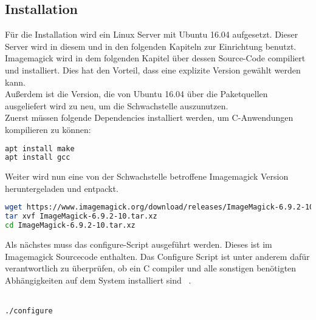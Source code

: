 \subsection{Installation}\label{subsec:installation}

Für die Installation wird ein Linux Server mit Ubuntu 16.04 aufgesetzt.
Dieser Server wird in diesem und in den folgenden Kapiteln zur Einrichtung benutzt.\\

Imagemagick wird in dem folgenden Kapitel über dessen Source-Code compiliert und installiert.
Dies hat den Vorteil, dass eine explizite Version gewählt werden kann.\\

Außerdem ist die Version, die von Ubuntu 16.04 über die Paketquellen ausgeliefert wird zu neu,
um die Schwachstelle auszunutzen.\\

Zuerst müssen folgende Dependencies installiert werden, um C-Anwendungen kompilieren zu können:

\begin{lstlisting}[language=Bash, caption=Imagemagick Installation: Dependencies,label={lst:installdep}]
apt install make
apt install gcc
\end{lstlisting}
\vspace{5mm}

Weiter wird nun eine von der Schwachstelle betroffene Imagemagick Version heruntergeladen und entpackt.
\begin{lstlisting}[language=Bash, caption=Imagemgaick Installation: Source Code herunterladen und entpacken,label={lst:installsource}]
wget https://www.imagemagick.org/download/releases/ImageMagick-6.9.2-10.tar.xz
tar xvf ImageMagick-6.9.2-10.tar.xz
cd ImageMagick-6.9.2-10.tar.xz
\end{lstlisting}
\vspace{5mm}

Als nächstes muss das configure-Script ausgeführt werden.
Dieses ist im Imagemagick Sourcecode enthalten.
Das Configure Script ist unter anderem dafür verantwortlich zu überprüfen,
ob ein C compiler und alle sonstigen benötigten Abhängigkeiten auf dem System installiert sind
~\cite{georgebrocklehurstMagicConfigureMake}.\\\\

\begin{lstlisting}[language=Bash, caption=Imagemagick Installation: Configure,label={lst:installconfigure}]
./configure

\end{lstlisting}
\vspace{5mm}

